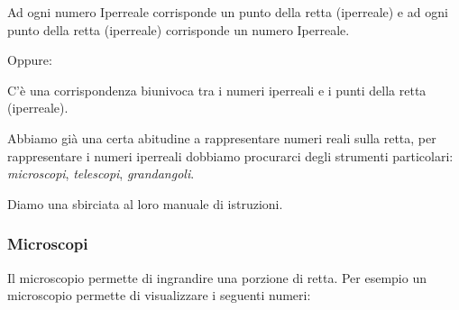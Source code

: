 \begin{postulato}
Ad ogni numero Iperreale corrisponde un punto della retta (iperreale) e ad 
ogni punto della retta (iperreale) corrisponde un numero Iperreale.
\end{postulato}

Oppure:

\begin{postulato}
C'è una corrispondenza biunivoca tra i numeri iperreali e 
i punti della retta (iperreale).
\end{postulato}

Abbiamo già una certa abitudine a rappresentare numeri reali sulla retta, 
per rappresentare i numeri iperreali dobbiamo procurarci degli strumenti 
particolari: \emph{microscopi}, \emph{telescopi}, \emph{grandangoli}.

Diamo una sbirciata al loro manuale di istruzioni.

\subsubsection{Microscopi}
\label{subsec:insnum_microscopio}

Il microscopio permette di ingrandire una porzione di retta. 
Per esempio un microscopio permette di visualizzare i seguenti numeri:

